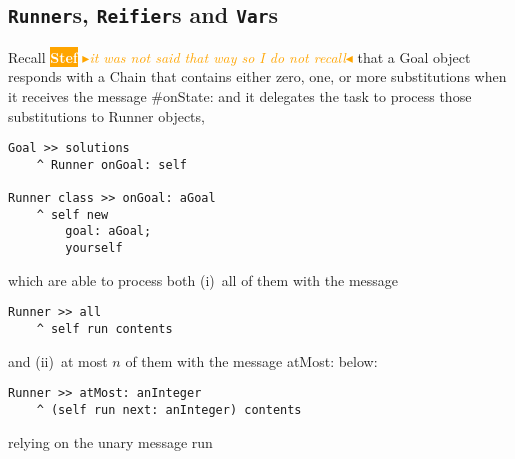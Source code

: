 \documentclass[a4paper,11pt]{article}
\newcommand{\nb}[3]{
		{\colorbox{#2}{\bfseries\sffamily\scriptsize\textcolor{white}{#1}}}
		{\textcolor{#2}{\sf\small$\blacktriangleright$\textit{#3}$\blacktriangleleft$}}}
\newcommand{\nb}[3]{}
\newcommand{\sd}[1]{\nb{Stef}{orange}{#1}}
\newcommand{\ct}[1]{{\textsf{#1}}\xspace}
\begin{document}
\subsection{\texttt{Runner}s, \texttt{Reifier}s and \texttt{Var}s}

Recall \sd{it was not said that way so I do not recall} that a \ct{Goal} object responds with a \ct{Chain} that contains either zero,
one, or more substitutions when it receives the message \ct{#onState:} and it
delegates the task to process those substitutions to \ct{Runner} objects,

\begin{verbatim}
Goal >> solutions
    ^ Runner onGoal: self

Runner class >> onGoal: aGoal
    ^ self new
        goal: aGoal;
        yourself
\end{verbatim}
which are able to process both (i)~all of them with the message
\begin{verbatim}
Runner >> all
    ^ self run contents
\end{verbatim}
and (ii)~at most $n$ of them with the message \ct{atMost:} below: 
\begin{verbatim}
Runner >> atMost: anInteger
    ^ (self run next: anInteger) contents
\end{verbatim}
relying on the unary message \ct{run}
\end{document}
